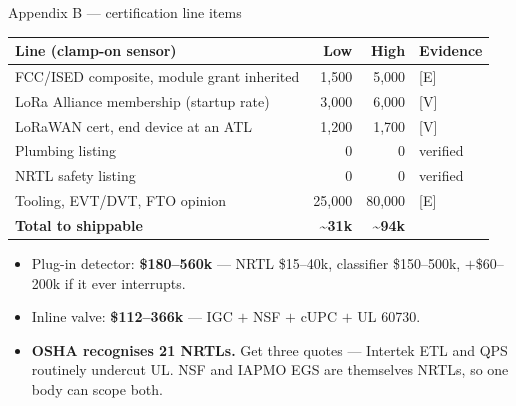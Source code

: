 \documentclass[aspectratio=169,t,10pt,xcolor={table,svgnames}]{beamer}
\newcommand{\hd}[1]{\textbf{\footnotesize #1}}
\begin{document}
\begin{frame}{Appendix B --- certification line items}
  \scriptsize
  \begin{tabular}{@{}p{}rrp{}@{}}
    \toprule
    \hd{Line (clamp-on sensor)} & \hd{Low} & \hd{High} & \hd{Evidence} \\
    \midrule
    FCC/ISED composite, module grant inherited & 1{,}500 & 5{,}000 & [E] \\
    LoRa Alliance membership (startup rate)    & 3{,}000 & 6{,}000 & [V] \\
    LoRaWAN cert, end device at an ATL         & 1{,}200 & 1{,}700 & [V] \\
    Plumbing listing                           & 0 & 0 & verified \\
    NRTL safety listing                        & 0 & 0 & verified \\
    Tooling, EVT/DVT, FTO opinion              & 25{,}000 & 80{,}000 & [E] \\
    \midrule
    \textbf{Total to shippable}                & \textbf{\textasciitilde31k} & \textbf{\textasciitilde94k} & \\
    \bottomrule
  \end{tabular}
  \vspace{0.7em}
  \begin{itemize}\scriptsize
    \item Plug-in detector: \textbf{\$180--560k} --- NRTL \$15--40k, classifier \$150--500k,
          $+$\$60--200k if it ever interrupts.
    \item Inline valve: \textbf{\$112--366k} --- IGC $+$ NSF $+$ cUPC $+$ UL 60730.
    \item \textbf{OSHA recognises 21 NRTLs.} Get three quotes --- Intertek ETL and QPS routinely
          undercut UL. NSF and IAPMO EGS are themselves NRTLs, so one body can scope both.
  \end{itemize}
\end{frame}
\end{document}
